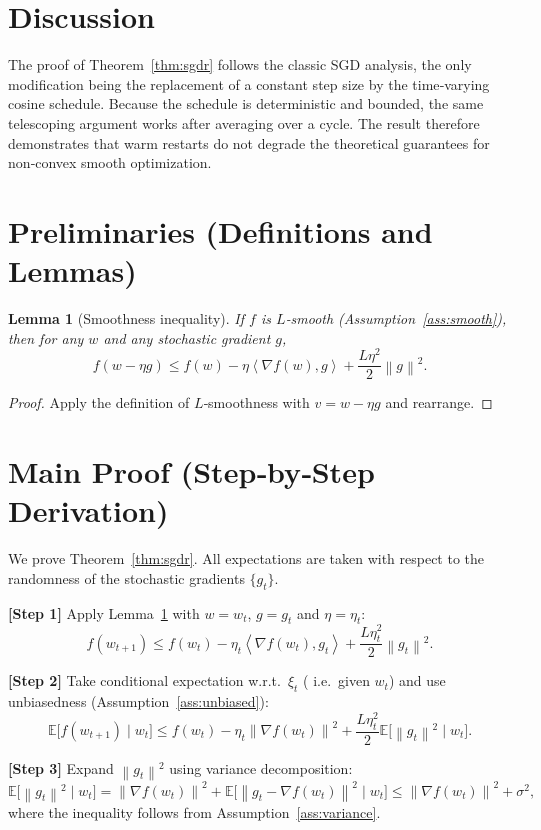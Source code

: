 \documentclass{article}
\newtheorem{lemma}{Lemma}
\newcommand{\E}{\mathbb{E}}
\newcommand{\norm}[1]{\left\lVert #1 \right\rVert}
\newcommand{\ip}[2]{\left\langle #1,#2 \right\rangle}
\begin{document}
\section*{Discussion}
The proof of Theorem~\ref{thm:sgdr} follows the classic SGD analysis,
the only modification being the replacement of a constant step size by the
time‑varying cosine schedule. Because the schedule is deterministic and
bounded, the same telescoping argument works after averaging over a cycle.
The result therefore demonstrates that warm restarts do not degrade the
theoretical guarantees for non‑convex smooth optimization.

\section*{Preliminaries (Definitions and Lemmas)}
\begin{lemma}[Smoothness inequality]\label{lem:smooth}
If $f$ is $L$‑smooth (Assumption~\ref{ass:smooth}), then for any $w$ and
any stochastic gradient $g$,
\[
f(w-\eta g)\le f(w)-\eta\ip{\nabla f(w)}{g}
+\frac{L\eta^{2}}{2}\norm{g}^{2}.
\tag{5}
\]
\end{lemma}
\begin{proof}
Apply the definition of $L$‑smoothness with $v=w-\eta g$ and rearrange.
\end{proof}

\section*{Main Proof (Step‑by‑Step Derivation)}
We prove Theorem~\ref{thm:sgdr}.  All expectations are taken with respect to the
randomness of the stochastic gradients $\{g_t\}$.

\bigskip
\noindent\textbf{[Step 1]} Apply Lemma~\ref{lem:smooth} with $w=w_t$, $g=g_t$ and
$\eta=\eta_t$:
\[
f(w_{t+1})\le f(w_t)-\eta_t\ip{\nabla f(w_t)}{g_t}
+\frac{L\eta_t^{2}}{2}\norm{g_t}^{2}.
\tag{6}
\]

\noindent\textbf{[Step 2]} Take conditional expectation w.r.t.\ $\xi_t$
( i.e.\ given $w_t$) and use unbiasedness (Assumption~\ref{ass:unbiased}):
\[
\E\!\bigl[f(w_{t+1})\mid w_t\bigr]
\le f(w_t)-\eta_t\norm{\nabla f(w_t)}^{2}
+\frac{L\eta_t^{2}}{2}\E\!\bigl[\norm{g_t}^{2}\mid w_t\bigr].
\tag{7}
\]

\noindent\textbf{[Step 3]} Expand $\norm{g_t}^{2}$ using variance decomposition:
\[
\E\!\bigl[\norm{g_t}^{2}\mid w_t\bigr]
=\norm{\nabla f(w_t)}^{2}
+\E\!\bigl[\norm{g_t-\nabla f(w_t)}^{2}\mid w_t\bigr]
\le\norm{\nabla f(w_t)}^{2}+\sigma^{2},
\tag{8}
\]
where the inequality follows from Assumption~\ref{ass:variance}.
\end{document}
